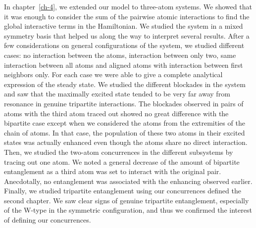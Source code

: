 In chapter~\ref{ch-4}, we extended our model to three-atom systems. We showed that it was enough to consider the sum of the pairwise atomic interactions to find the global interactive terms in the Hamiltonian. We studied the system in a mixed symmetry basis that helped us along the way to interpret several results. After a few considerations on  general configurations of the system, we studied different cases: no interaction between the atoms, interaction between only two, same interaction between all atoms and aligned atoms with interaction between first neighbors only. For each case we were able to give a complete analytical expression of the steady state. We studied the different blockades in the system and saw that the maximally excited state tended to be very far away from resonance in genuine tripartite interactions. The  blockades observed in pairs of atoms with the third atom traced out showed no great difference with the bipartite case except when we considered the atoms from the extremities of the chain of atoms. In that case, the population of these two atoms in their excited states was actually enhanced even though the atoms  share no direct interaction. Then, we studied the two-atom concurrences in the different subsystems by tracing out one atom. We noted a general decrease of the amount of bipartite entanglement as a third atom was set to interact with the original pair. Anecdotally, no entanglement was associated with the enhancing observed earlier. Finally, we studied  tripartite entanglement using our concurrences defined the second chapter. We saw clear signs of genuine tripartite entanglement, especially of the W-type in the symmetric configuration, and thus we confirmed the interest of defining our concurrences.


